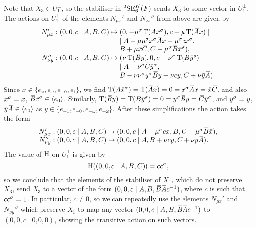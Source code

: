 Note that $X_3 \in U_1^{\perp}$, so the stabiliser in 
${}^2\mathrm{SE}_6^K(F)$ sends $X_3$ to some vector
in $U_1^{\perp}$. 
The actions on $U_1^{\perp}$ of the elements $N_{\mu x}'$ and $N_{\nu x}''$ from above are given
by
\begin{equation}
	\begin{array}{r@{\;}c@{\;}l}
		N_{\mu x}' : (0,0,c\mid A,B,C) & \mapsto & 
			(0,-\mu^{\s}\Tr(A\ovx^{\s}), c+\mu\Tr(\ovA x) \mid \\
		& & \mid A - \mu\mu^{\s} x^{\s} \ovA x - \mu^{\s} c x^{\s}, \\
		& &		 B + \mu\ovx\ovC, C - \mu^{\s} \ovB \ovx^{\s}), \\
				 
		N_{\nu y}'' : (0,0,c\mid A,B,C) & \mapsto & 
			(\nu\Tr(\ovB y), 0, c-\nu^{\s}\Tr(B\ovy^{s}) \mid \\
		& & \mid A - \nu^{\s}\ovC\ovy^{\s}, \\
		& & B - \nu\nu^{\s} y^{\s}\ovB y + \nu c y, C + \nu\ovy\ovA). 
	\end{array}
\end{equation}
Since $x \in \{e_{\bar{\omega}}, e_{\omega}, e_{-0}, e_1\}$, we find $\Tr(A\ovx^{\s}) = 
\Tr(\ovA x) = 0 = x^{\s} \ovA x = \ovx \ovC$, and also $x^{\sigma} = x$, $\ovB \ovx^{\s} \in 
\langle e_0 \rangle$. Similarly, $\Tr(\ovB y) = \Tr(B\ovy^{\s}) = 0 = y^{\s} \ovB y = \ovC \ovy^{\s}$,
and $y^{\sigma} = y$, $\ovy \ovA \in \langle e_0 \rangle$ as $y \in \{ e_{-1}, e_{-0}, e_{-\omega}, 
e_{-\bar{\omega}} \}$. After these simplifications the action takes the form
\begin{equation}
	\begin{array}{r@{\;}c@{\;}l}
		N_{\mu x}' : (0,0,c\mid A,B,C) & \mapsto &
			(0,0,c\mid A  - \mu^{\s} c x, B, C - \mu^{\s}\ovB\ovx ), \\
		
		N_{\nu y}'' : (0,0,c\mid A,B,C) & \mapsto &
			(0,0,c\mid A, B + \nu c y, C + \nu \ovy \ovA).
	\end{array}
\end{equation}
The value of $\mathrm{H}$ on $U_1^{\perp}$ is given by
\begin{equation}
	\mathrm{H}((0,0,c\mid A,B,C)) = c c^{\sigma},
\end{equation}
so we conclude that the elements of the stabiliser of $X_1$, 
which do not preserve $X_3$, 
send $X_3$ to a vector of the form $(0,0,c\mid A,B, \ovB \ovA 
c^{-1})$, where $c$ is such that $c c^{\sigma} = 1$. In particular,
$c \neq 0$, so we can repeatedly use the elements $N_{\mu x}'$
and $N_{\nu y}''$ which preserve $X_1$ to map any vector
$(0,0,c\mid A,B, \ovB \ovA c^{-1})$ to $(0,0,c \mid 0,0,0)$,
showing the transitive action on such vectors. 

